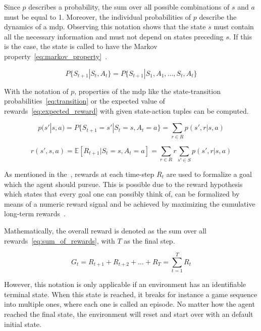 \documentclass[draft,final]{vutinfth} %
\begin{document}
    Since $p$ describes a probability, the sum over all possible combinations of $s$ and $a$ must be equal to 1.
    Moreover, the individual probabilities of $p$ describe the dynamics of a \gls{mdp}.
    Observing this notation shows that the state $s$ must contain all the necessary information and must not depend on states preceding $s$.
    If this is the case, the state is called to have the Markov property~\eqref{eq:markov_property}~\citep{francois-lavet_introduction_2018}.

    \begin{equation}
        P\{S_{t+1}|S_t,A_t\} = P\{S_{t+1}|S_1,A_1,\ldots,S_t,A_t\} \label{eq:markov_property}
    \end{equation}

    With the notation of $p$, properties of the \gls{mdp} like the state-transition probabilities~\eqref{eq:transition} or the expected value of rewards~\eqref{eq:expected_reward} with given state-action tuples can be computed.

    \begin{equation}
        p(s'|s,a) = P\{S_{t+1}=s'| S_t=s, A_t=a\} = \sum_{r \in \mathit{R}} p(s',r | s,a) \label{eq:transition}
    \end{equation}

    \begin{equation}
        r(s',s,a) = \mathbb{E}[R_{t+1} | S_t=s, A_t=a] = \sum_{r\in \mathit{R}} r \sum_{s' \in \mathit{S}} p(s',r | s,a) \label{eq:expected_reward}
    \end{equation}

    As mentioned in the~, rewards at each time-step $R_t$ are used to formalize a goal which the agent should pursue.
    This is possible due to the reward hypothesis which states that every goal one can possibly think of, can be formalized by means of a numeric reward signal and be achieved by maximizing the cumulative long-term rewards~\citep{sutton_reinforcement_2018}.

    Mathematically, the overall reward is denoted as the sum over all rewards~\eqref{eq:sum_of_rewards}, with $T$ as the final step.

    \begin{equation}
        G_t=R_{t+1} + R_{t+2}+ \ldots + R_{T}  =\sum_{t=1}^{T} R_{t}\label{eq:sum_of_rewards}
    \end{equation}

    However, this notation is only applicable if an environment has an identifiable terminal state.
    When this state is reached, it breaks for instance a game sequence into multiple ones, where each one is called an episode.
    No matter how the agent reached the final state, the environment will reset and start over with an default initial state.
\end{document}
